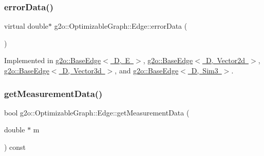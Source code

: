\mbox{\label{classg2o_1_1_optimizable_graph_1_1_edge_a460a0cb0256b0a91edb131e25181f57b}} 
\subsubsection{\texorpdfstring{error\+Data()}{errorData()}\hspace{0.1cm}{\footnotesize\ttfamily [2/2]}}
{\footnotesize\ttfamily virtual double$\ast$ g2o\+::\+Optimizable\+Graph\+::\+Edge\+::error\+Data (\begin{DoxyParamCaption}{ }\end{DoxyParamCaption})\hspace{0.3cm}{\ttfamily [pure virtual]}}



Implemented in \mbox{\hyperlink{classg2o_1_1_base_edge_ab80452c1134036928a2af6303412a3c4}{g2o\+::\+Base\+Edge$<$ D, E $>$}}, \mbox{\hyperlink{classg2o_1_1_base_edge_ab80452c1134036928a2af6303412a3c4}{g2o\+::\+Base\+Edge$<$ D, Vector2d $>$}}, \mbox{\hyperlink{classg2o_1_1_base_edge_ab80452c1134036928a2af6303412a3c4}{g2o\+::\+Base\+Edge$<$ D, Vector3d $>$}}, and \mbox{\hyperlink{classg2o_1_1_base_edge_ab80452c1134036928a2af6303412a3c4}{g2o\+::\+Base\+Edge$<$ D, Sim3 $>$}}.

\mbox{\label{classg2o_1_1_optimizable_graph_1_1_edge_abe22d8f67447fc93c49b5aa730eaba83}} 
\subsubsection{\texorpdfstring{get\+Measurement\+Data()}{getMeasurementData()}}
{\footnotesize\ttfamily bool g2o\+::\+Optimizable\+Graph\+::\+Edge\+::get\+Measurement\+Data (\begin{DoxyParamCaption}\item[{double $\ast$}]{m }\end{DoxyParamCaption}) const\hspace{0.3cm}{\ttfamily [virtual]}}

